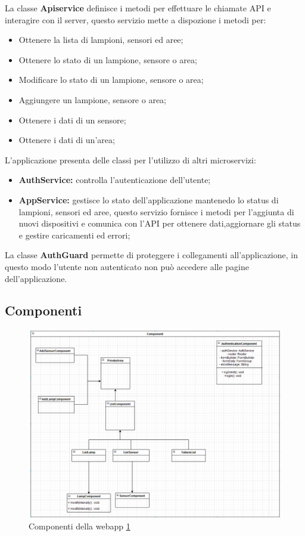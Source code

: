 La classe \textbf{Apiservice} definisce i metodi per effettuare le chiamate API e interagire con il server, questo servizio mette a dispozione i metodi per:
\begin{itemize}
    \item Ottenere la lista di lampioni, sensori ed aree;
    \item Ottenere lo stato di un lampione, sensore o area;
    \item Modificare lo stato di un lampione, sensore o area;
    \item Aggiungere un lampione, sensore o area;
    \item Ottenere i dati di un sensore;
    \item Ottenere i dati di un'area;
\end{itemize}

L'applicazione presenta delle classi per l'utilizzo di altri microservizi:
\begin{itemize}
    \item \textbf{AuthService:} controlla l'autenticazione dell'utente;
    \item \textbf{AppService:} gestisce lo stato dell'applicazione mantenedo lo status di lampioni, sensori ed aree, questo servizio fornisce i metodi per l'aggiunta di nuovi dispositivi e comunica con l'API per ottenere dati,aggiornare gli status e gestire caricamenti ed errori;
\end{itemize}

La classe \textbf{AuthGuard} permette di proteggere i collegamenti all'applicazione, in questo modo l'utente non autenticato non può accedere alle pagine dell'applicazione.

\subsection{Componenti}

\begin{figure}[h]
    \centering
    \includegraphics[width=\textwidth]{img/components_webapp.png}
    \caption{Componenti della webapp \ref{fig:components_webapp}}
    \label{fig:components_webapp}
\end{figure}

